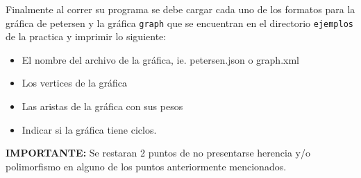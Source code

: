 \documentclass{article}
\begin{document}
\begin{enumerate}
   Finalmente al correr su programa se debe cargar cada uno de los formatos para la gráfica de petersen y la gráfica \texttt{graph} que se encuentran en el directorio \texttt{ejemplos} de la practica y imprimir lo siguiente:
   
   \begin{itemize}
   \item El nombre del archivo de la gráfica, ie. petersen.json o graph.xml
   \item Los vertices de la gráfica
   \item Las aristas de la gráfica con sus pesos
   \item Indicar si la gráfica tiene ciclos.
   \end{itemize}

 \textbf{IMPORTANTE:} Se restaran 2 puntos de no presentarse herencia y/o polimorfismo en alguno de los puntos anteriormente mencionados.

\end{enumerate}
\end{document}
